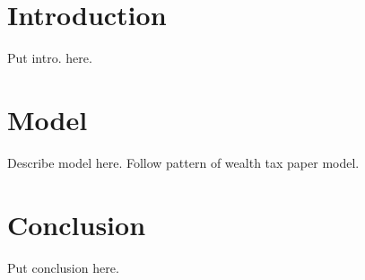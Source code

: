 \documentclass[letterpaper,12pt]{article}
\theoremstyle{definition}
\begin{document}
\begin{spacing}{1.5}

\section{Introduction}\label{SecIntro}

  Put intro. here.


\section{Model}\label{SecModel}

  Describe model here. Follow pattern of wealth tax paper model.



\section{Conclusion}\label{SecConclusion}

  Put conclusion here.



\clearpage


\end{spacing}


\newpage









\end{document}
